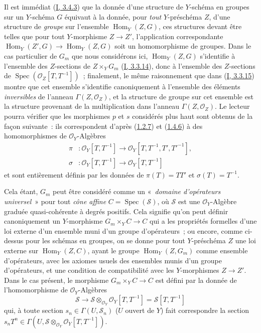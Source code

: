\begin{remark}[8.3.9]
Il est immédiat (\hyperref[I.3.4.3-fr]{I, 3.4.3}) que la donnée d'une structure
de $Y$-schéma en groupes sur un $Y$-schéma $G$ équivaut à la donnée, pour
\emph{tout} $Y$-préschéma $Z$, d'une structure de \emph{groupe} sur
l'ensemble $\operatorname{Hom}_Y(Z,G)$, ces structures devant être telles que
pour tout $Y$-morphisme $Z\to Z'$, l'application correspondante
$\operatorname{Hom}_Y(Z',G)\to\operatorname{Hom}_Y(Z,G)$ soit un
homomorphisme de groupes. Dans le cas particulier de $G_m$ que nous
considérons ici, $\operatorname{Hom}_Y(Z,G)$ s'identifie à l'ensemble des
$Z$-sections de $Z\times_YG_m$ (\hyperref[I.3.3.14-fr]{I, 3.3.14}), donc à
l'ensemble des $Z$-sections de
$\operatorname{Spec}(\mathcal{O}_Z[T,T^{-1}])$~; finalement, le même
raisonnement que dans (\hyperref[I.3.3.15-fr]{I, 3.3.15}) montre que cet
ensemble s'identifie canoniquement à l'ensemble des éléments \emph{inversibles}
de l'anneau $\Gamma(Z,\mathcal{O}_Z)$, et la structure de groupe sur cet
ensemble est la structure provenant de la multiplication dans l'anneau
$\Gamma(Z,\mathcal{O}_Z)$. Le lecteur pourra vérifier que les morphismes $p$
et $s$ considérés plus haut sont obtenus de la façon suivante~: ils
correspondent d'après (\hyperref[II.1.2.7-fr]{1.2.7}) et
(\hyperref[II.1.4.6-fr]{1.4.6}) à des homomorphismes de $\mathcal{O}_Y$-Algèbres
\begin{align*}
  \pi &: \mathcal{O}_Y[T,T^{-1}]
  \to\mathcal{O}_Y[T,T^{-1},T',T'^{-1}],\\
  \sigma &: \mathcal{O}_Y[T,T^{-1}]\to\mathcal{O}_Y[T,T^{-1}]
\end{align*}
et sont entièrement définis par les données de $\pi(T)=TT'$ et
$\sigma(T)=T^{-1}$.

Cela étant, $G_m$ peut être considéré comme un «~\emph{domaine d'opérateurs
universel}~» pour tout \emph{cône affine}
$C=\operatorname{Spec}(\mathcal{S})$, où $\mathcal{S}$ est une
$\mathcal{O}_Y$-Algèbre graduée quasi-cohérente à degrés positifs. Cela
signifie qu'on peut définir canoniquement un $Y$-morphisme
$G_m\times_YC\to C$ qui a les propriétés formelles d'une loi externe d'un
ensemble muni d'un groupe d'opérateurs~; ou encore, comme ci-dessus pour les
schémas en groupes, on se donne pour tout $Y$-préschéma $Z$ une loi externe
sur $\operatorname{Hom}_Y(Z,C)$, ayant le groupe
$\operatorname{Hom}_Y(Z,G_m)$ comme ensemble d'opérateurs, avec les axiomes
usuels des ensembles munis d'un groupe d'opérateurs, et une condition de
compatibilité avec les $Y$-morphismes $Z\to Z'$. Dans le cas présent, le
morphisme $G_m\times_YC\to C$ est défini par la donnée de l'homomorphisme de
$\mathcal{O}_Y$-Algèbres
\[
  \mathcal{S}\to
  \mathcal{S}\otimes_{\mathcal{O}_Y}\mathcal{O}_Y[T,T^{-1}]
  =\mathcal{S}[T,T^{-1}]
\]
qui, à toute section $s_n\in\Gamma(U,\mathcal{S}_n)$ ($U$ ouvert de $Y$) fait
correspondre la section
$s_nT^n\in\Gamma(U,\mathcal{S}\otimes_{\mathcal{O}_Y}
\mathcal{O}_Y[T,T^{-1}])$.


\end{remark}
